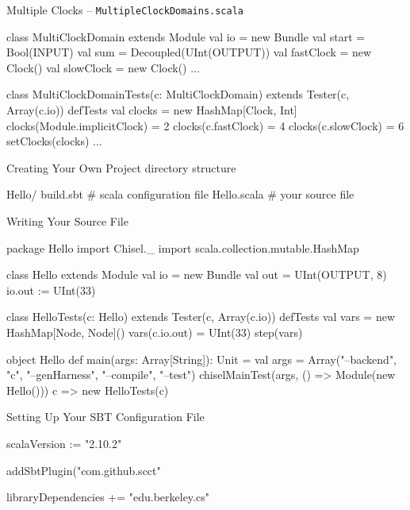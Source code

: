 \documentclass[xcolor=pdflatex,dvipsnames,table]{beamer}
\begin{document}
\begin{frame}[fragile]{Multiple Clocks -- \tt MultipleClockDomains.scala}
\begin{scala}
class MultiClockDomain extends Module {
  val io = new Bundle {
    val start = Bool(INPUT)
    val sum = Decoupled(UInt(OUTPUT))
  }
  val fastClock = new Clock()
  val slowClock = new Clock()
  ...
}

class MultiClockDomainTests(c: MultiClockDomain) 
    extends Tester(c, Array(c.io)) {
  defTests {
    val clocks = new HashMap[Clock, Int]
    clocks(Module.implicitClock) = 2
    clocks(c.fastClock) = 4
    clocks(c.slowClock) = 6
    setClocks(clocks)
    ...
  }
}
\end{scala}
\end{frame}

\begin{frame}[fragile]{Creating Your Own Project}
directory structure
\begin{bash}
Hello/
  build.sbt   # scala configuration file
  Hello.scala # your source file
\end{bash}

\end{frame}

\begin{frame}[fragile]{Writing Your Source File}

{
\begin{scala}
package Hello
import Chisel._
import scala.collection.mutable.HashMap

class Hello extends Module {
  val io = new Bundle { 
    val out = UInt(OUTPUT, 8) }
  io.out := UInt(33)
}

class HelloTests(c: Hello) extends Tester(c, Array(c.io)) {
  defTests {
    val vars = new HashMap[Node, Node]()
    vars(c.io.out) = UInt(33)
    step(vars)
  }
}

object Hello {
  def main(args: Array[String]): Unit = {
    val args = Array("--backend", "c", "--genHarness", "--compile", "--test")
    chiselMainTest(args, () => Module(new Hello())) {
      c => new HelloTests(c) }
} }
\end{scala}
}

\end{frame}

\begin{frame}[fragile]{Setting Up Your SBT Configuration File}
\begin{scala}
scalaVersion := "2.10.2"

addSbtPlugin("com.github.scct" %

libraryDependencies += 
  "edu.berkeley.cs" %
\end{scala}
\end{frame}
\end{document}
